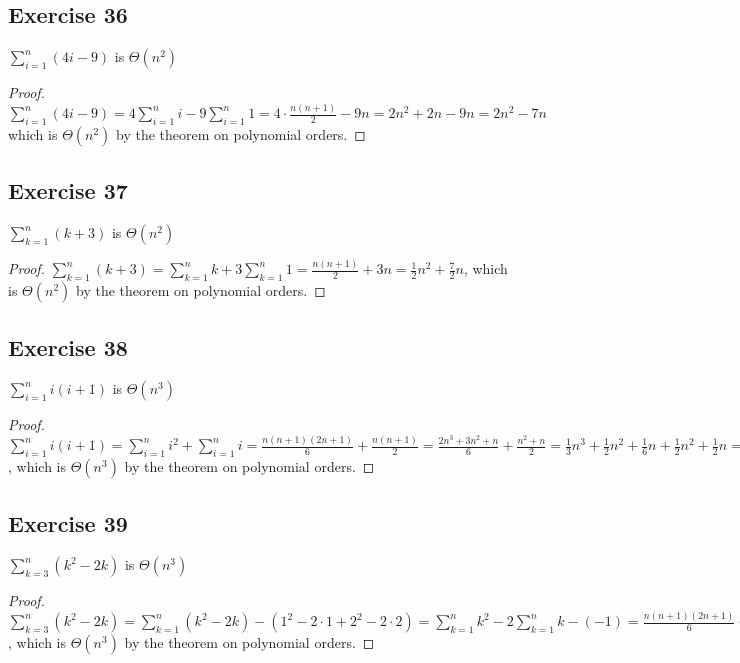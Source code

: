 \documentclass[14pt]{extarticle}
\newcommand{\dps}{\displaystyle}
\begin{document}
\subsection{Exercise 36}
\(\dps \sum_{i=1}^{n} (4i-9)\) is \(\Theta(n^2)\)

\begin{proof}
    \(\dps \sum_{i=1}^{n} (4i-9) = 4\sum_{i=1}^n i - 9\sum_{i=1}^n 1 = 4 \cdot \frac{n(n+1)}{2} - 9n = 2n^2 + 2n - 9n = 2n^2-7n\)
    which is \(\Theta(n^2)\) by the theorem on polynomial orders.
\end{proof}

\subsection{Exercise 37}
\(\dps \sum_{k=1}^{n} (k+3)\) is \(\Theta(n^2)\)

\begin{proof}
    \(\dps \sum_{k=1}^{n} (k+3) = \sum_{k=1}^{n} k + 3\sum_{k=1}^{n} 1 = \frac{n(n+1)}{2} + 3n =\frac{1}{2}n^2+\frac{7}{2}n\),
    which is \(\Theta(n^2)\) by the theorem on polynomial orders.
\end{proof}

\subsection{Exercise 38}
\(\dps \sum_{i=1}^{n} i(i+1)\) is \(\Theta(n^3)\)

\begin{proof}
    \(\dps \sum_{i=1}^{n} i(i+1) = \sum_{i=1}^{n} i^2 + \sum_{i=1}^{n} i = \frac{n(n+1)(2n+1)}{6} + \frac{n(n+1)}{2} =
    \frac{2n^3+3n^2+n}{6} + \frac{n^2 + n}{2} = \frac{1}{3}n^3 + \frac{1}{2}n^2 + \frac{1}{6}n + \frac{1}{2}n^2 + \frac{1}{2}n
    = \frac{1}{3}n^3 + n^2 + \frac{2}{3}n\), which is \(\Theta (n^3)\) by the theorem on polynomial orders.
\end{proof}

\subsection{Exercise 39}
\(\dps \sum_{k=3}^{n} (k^2-2k)\) is \(\Theta(n^3)\)

\begin{proof}
    \(\dps \sum_{k=3}^{n} (k^2-2k) = \sum_{k=1}^{n} (k^2-2k) - (1^2 - 2 \cdot 1 + 2^2 - 2 \cdot 2) = \sum_{k=1}^{n} k^2 -
    2\sum_{k=1}^{n} k - (-1) = \frac{n(n+1)(2n+1)}{6} - 2\cdot\frac{n(n+1)}{2} + 1 = \frac{2n^3 + 3n^2 + n}{6} + n^2 +
    n + 1 = \frac{1}{3}n^3 + \frac{3}{2}n^2 + \frac{7}{6}n + 1\), which is \(\Theta (n^3)\) by the theorem on polynomial orders.
\end{proof}
\end{document}
